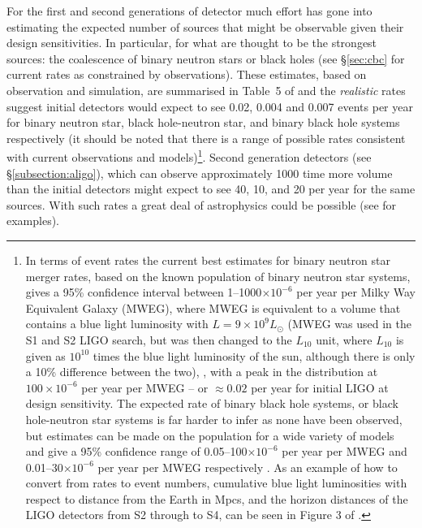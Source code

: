 \documentclass{article}
\begin{document}
For the first and second generations of detector much effort has gone into
estimating the expected number of sources that might be observable given their
design sensitivities. In particular, for what are thought to be the strongest
sources: the coalescence of binary neutron stars or black holes (see
\S\ref{sec:cbc} for current rates as constrained by observations). These
estimates, based on observation and simulation, are summarised in Table~5 of
\cite{Abadie:2010e} and the {\it realistic} rates suggest initial detectors
would expect to see 0.02, 0.004 and 0.007 events per year for binary neutron
star, black hole-neutron star, and binary black hole systems respectively (it
should be noted that there is a range of possible rates consistent with current
observations and models)\footnote{In terms of event rates the current best
estimates for binary neutron star merger rates, based on the known population of
binary neutron star systems, gives a 95\% confidence interval between
1--1000$\times10^{-6}$ per year per Milky Way Equivalent Galaxy (MWEG), where
MWEG is equivalent to a volume that contains a blue light luminosity with $L =
9\times10^9L_{\odot}$ (MWEG was used in the S1 and S2 LIGO search, but was then
changed to the $L_{10}$ unit, where $L_{10}$ is given as $10^{10}$ times the
blue light luminosity of the sun, although there is only a 10\% difference
between the two), \cite{Abadie:2010e, Kalogera:2004a, Kalogera:2004b}, with a
peak in the distribution at $100\times10^{-6}$ per year per MWEG -- or $\approx
0.02$ per year for initial LIGO at design sensitivity. The expected rate of
binary black hole systems, or black hole-neutron star systems is far harder to
infer as none have been observed, but estimates can be made on the population
for a wide variety of models and give a 95\% confidence range of
0.05--100$\times10^{-6}$ per year per MWEG and 0.01--30$\times10^{-6}$ per year
per MWEG respectively \cite{Abadie:2010e, OShaughnessy:2005, OShaughnessy:2008,
Abbott:2008a}. As an example of how to convert from rates to event numbers,
cumulative blue light luminosities with respect to distance from the Earth in
Mpcs, and the horizon distances of the LIGO detectors from S2 through to S4, can
be seen in Figure 3 of \cite{Abbott:2008a}.}. Second generation detectors (see
\S\ref{subsection:aligo}), which can observe approximately 1000 time more volume
than the initial detectors might expect to see 40, 10, and 20 per year for the
same sources. With such rates a great deal of astrophysics could be possible
(see \cite{Sathyaprakash:2009} for examples).
\end{document}
